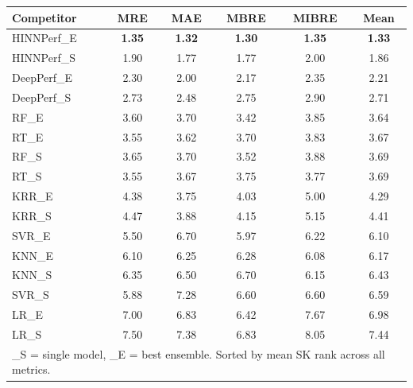 \begin{tabular}{lccccc}
\toprule
Competitor & MRE & MAE & MBRE & MIBRE & Mean \\ 
\midrule
\midrule
HINNPerf\_E & \textbf{1.35} & \textbf{1.32} & \textbf{1.30} & \textbf{1.35} & \textbf{1.33} \\
HINNPerf\_S & 1.90 & 1.77 & 1.77 & 2.00 & 1.86 \\
DeepPerf\_E & 2.30 & 2.00 & 2.17 & 2.35 & 2.21 \\
DeepPerf\_S & 2.73 & 2.48 & 2.75 & 2.90 & 2.71 \\
RF\_E & 3.60 & 3.70 & 3.42 & 3.85 & 3.64 \\
RT\_E & 3.55 & 3.62 & 3.70 & 3.83 & 3.67 \\
RF\_S & 3.65 & 3.70 & 3.52 & 3.88 & 3.69 \\
RT\_S & 3.55 & 3.67 & 3.75 & 3.77 & 3.69 \\
KRR\_E & 4.38 & 3.75 & 4.03 & 5.00 & 4.29 \\
KRR\_S & 4.47 & 3.88 & 4.15 & 5.15 & 4.41 \\
SVR\_E & 5.50 & 6.70 & 5.97 & 6.22 & 6.10 \\
KNN\_E & 6.10 & 6.25 & 6.28 & 6.08 & 6.17 \\
KNN\_S & 6.35 & 6.50 & 6.70 & 6.15 & 6.43 \\
SVR\_S & 5.88 & 7.28 & 6.60 & 6.60 & 6.59 \\
LR\_E & 7.00 & 6.83 & 6.42 & 7.67 & 6.98 \\
LR\_S & 7.50 & 7.38 & 6.83 & 8.05 & 7.44 \\
\bottomrule
\multicolumn{6}{l}{\footnotesize \_S = single model, \_E = best ensemble. Sorted by mean SK rank across all metrics.} \\
\end{tabular}
